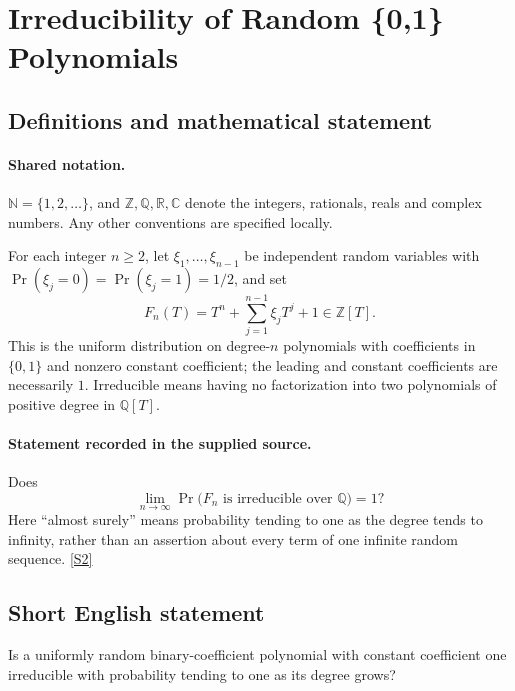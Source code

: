 \documentclass[11pt]{article}
\newcommand{\sref}[2]{\hyperlink{source:#1:#2}{[S#2]}}
\begin{document}
\section{Irreducibility of Random \{0,1\} Polynomials}\label{statement}

\subsection{Definitions and mathematical statement}

\paragraph{Shared notation.}$\mathbb N=\{1,2,\ldots\}$, and $\mathbb Z,\mathbb Q,\mathbb R,\mathbb C$ denote the integers, rationals, reals and complex numbers. Any other conventions are specified locally.


For each integer $n\geq2$, let $\xi_1,\ldots,\xi_{n-1}$ be independent random variables with
$\Pr(\xi_j=0)=\Pr(\xi_j=1)=1/2$, and set
\[
 F_n(T)=T^n+\sum_{j=1}^{n-1}\xi_jT^j+1\in\mathbb Z[T].
\]
This is the uniform distribution on degree-$n$ polynomials with coefficients in $\{0,1\}$ and nonzero constant coefficient; the leading and constant coefficients are necessarily $1$. Irreducible means having no factorization into two polynomials of positive degree in $\mathbb Q[T]$.
\paragraph{Statement recorded in the supplied source.}
Does
\[
 \lim_{n\to\infty}\Pr\bigl(F_n\text{ is irreducible over }\mathbb Q\bigr)=1?
\]
Here ``almost surely'' means probability tending to one as the degree tends to infinity, rather than an assertion about every term of one infinite random sequence. \sref{statement}{2}
\subsection{Short English statement}
Is a uniformly random binary-coefficient polynomial with constant coefficient one irreducible with probability tending to one as its degree grows?
\end{document}
